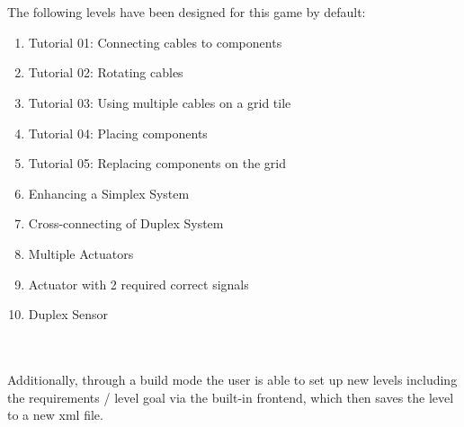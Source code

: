 \\ \\

The following levels have been designed for this game by default:
\begin{enumerate}
    \item Tutorial 01: Connecting cables to components
    \item Tutorial 02: Rotating cables
    \item Tutorial 03: Using multiple cables on a grid tile
    \item Tutorial 04: Placing components
    \item Tutorial 05: Replacing components on the grid
    \item Enhancing a Simplex System
    \item Cross-connecting of Duplex System
    \item Multiple Actuators
    \item Actuator with 2 required correct signals
    \item Duplex Sensor
\end{enumerate}
\\
\\
Additionally, through a build mode the user is able to set up new levels including the requirements / level goal via the built-in
frontend, which then saves the level to a new xml file.
